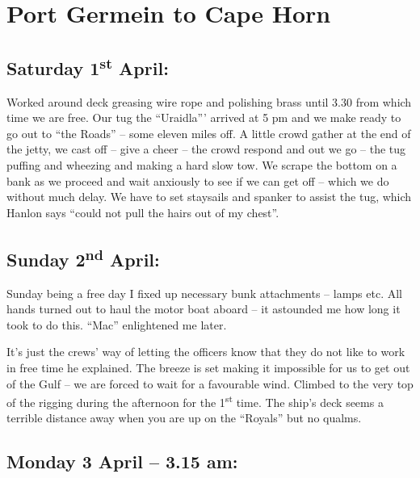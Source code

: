 \documentclass[
  11pt,
  msmallroyalvopaper
]{memoir}
\begin{document}
\hypertarget{leaving}{%
\chapter{Port Germein to Cape Horn}\label{leaving}}

\hypertarget{saturday-1st-april}{%
\section{\texorpdfstring{Saturday 1\textsuperscript{st}
April:}{Saturday 1st April:}}\label{saturday-1st-april}}

Worked around deck greasing wire rope and polishing brass until 3.30
from which time we are free. Our tug the ``Uraidla''' arrived at 5 pm
and we make ready to go out to ``the Roads'' -- some eleven miles off. A
little crowd gather at the end of the jetty, we cast off -- give a cheer
-- the crowd respond and out we go -- the tug puffing and wheezing and
making a hard slow tow. We scrape the bottom on a bank as we proceed and
wait anxiously to see if we can get off -- which we do without much
delay. We have to set staysails and spanker to assist the tug, which
Hanlon says ``could not pull the hairs out of my chest''.

\hypertarget{sunday-2nd-april}{%
\section{\texorpdfstring{Sunday 2\textsuperscript{nd}
April:}{Sunday 2nd April:}}\label{sunday-2nd-april}}

Sunday being a free day I fixed up necessary bunk attachments -- lamps
etc. All hands turned out to haul the motor boat aboard -- it astounded
me how long it took to do this. ``Mac'' enlightened me later.

It's just the crews' way of letting the officers know that they do not
like to work in free time he explained. The breeze is set making it
impossible for us to get out of the Gulf -- we are forced to wait for a
favourable wind. Climbed to the very top of the rigging during the
afternoon for the 1\textsuperscript{st} time. The ship's deck seems a
terrible distance away when you are up on the ``Royals'' but no qualms.

\hypertarget{monday-3-april-3.15-am}{%
\section{Monday 3 April -- 3.15 am:}\label{monday-3-april-3.15-am}}
\end{document}
